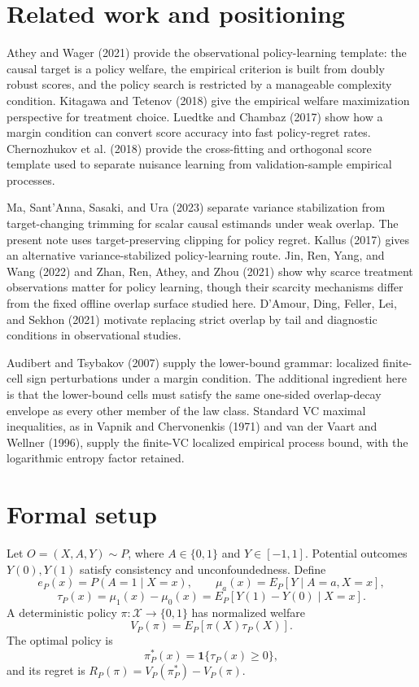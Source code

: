 \documentclass[11pt]{article}
\newcommand{\one}{\mathbf{1}}
\theoremstyle{definition}
\theoremstyle{plain}
\theoremstyle{remark}
\begin{document}
\section{Related work and positioning}
Athey and Wager (2021) provide the observational policy-learning template:
the causal target is a policy welfare, the empirical criterion is built from
doubly robust scores, and the policy search is restricted by a manageable
complexity condition.  Kitagawa and Tetenov (2018) give the empirical welfare
maximization perspective for treatment choice.  Luedtke and Chambaz (2017)
show how a margin condition can convert score accuracy into fast policy-regret
rates.  Chernozhukov et al. (2018) provide the cross-fitting and orthogonal
score template used to separate nuisance learning from validation-sample
empirical processes.

Ma, Sant'Anna, Sasaki, and Ura (2023) separate variance stabilization from
target-changing trimming for scalar causal estimands under weak overlap.  The
present note uses target-preserving clipping for policy regret.  Kallus
(2017) gives an alternative variance-stabilized policy-learning route.  Jin,
Ren, Yang, and Wang (2022) and Zhan, Ren, Athey, and Zhou (2021) show why
scarce treatment observations matter for policy learning, though their
scarcity mechanisms differ from the fixed offline overlap surface studied
here.  D'Amour, Ding, Feller, Lei, and Sekhon (2021) motivate replacing
strict overlap by tail and diagnostic conditions in observational studies.

Audibert and Tsybakov (2007) supply the lower-bound grammar: localized
finite-cell sign perturbations under a margin condition.  The additional
ingredient here is that the lower-bound cells must satisfy the same
one-sided overlap-decay envelope as every other member of the law class.
Standard VC maximal inequalities, as in Vapnik and Chervonenkis (1971) and
van der Vaart and Wellner (1996), supply the finite-VC localized empirical
process bound, with the logarithmic entropy factor retained.

\section{Formal setup}
Let \(O=(X,A,Y)\sim P\), where \(A\in\{0,1\}\) and \(Y\in[-1,1]\).  Potential
outcomes \(Y(0),Y(1)\) satisfy consistency and unconfoundedness.  Define
\[
e_P(x)=P(A=1\mid X=x),\qquad
\mu_a(x)=E_P[Y\mid A=a,X=x],
\]
\[
\tau_P(x)=\mu_1(x)-\mu_0(x)=E_P[Y(1)-Y(0)\mid X=x].
\]
A deterministic policy \(\pi:\mathcal X\to\{0,1\}\) has normalized welfare
\[
V_P(\pi)=E_P[\pi(X)\tau_P(X)].
\]
The optimal policy is
\[
\pi_P^*(x)=\one\{\tau_P(x)\ge0\},
\]
and its regret is \(R_P(\pi)=V_P(\pi_P^*)-V_P(\pi)\).
\end{document}
